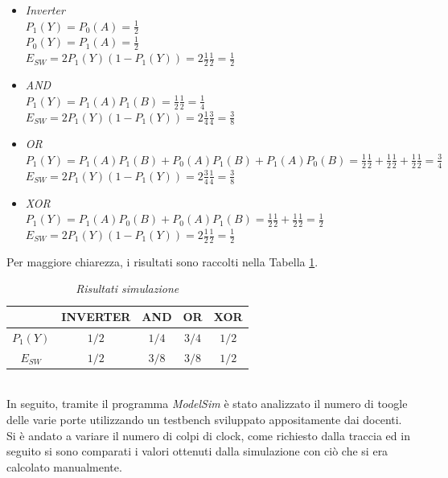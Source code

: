 \begin{itemize}
	\item \textit{Inverter} \\
	$P_{1}(Y)=P_{0}(A)=\frac{1}{2}$ \\
	$P_{0}(Y)=P_{1}(A)=\frac{1}{2}$ \\
	$E_{SW}=2P_{1}(Y)(1-P_{1}(Y))=2\frac{1}{2}\frac{1}{2}=\frac{1}{2}$\\
	\item \textit{AND} \\
	$P_{1}(Y)=P_{1}(A)P_{1}(B)=\frac{1}{2}\frac{1}{2}=\frac{1}{4}$ \\
	$E_{SW}=2P_{1}(Y)(1-P_{1}(Y))=2\frac{1}{4}\frac{3}{4}=\frac{3}{8}$\\
	\item \textit{OR} \\
	$P_{1}(Y)=P_{1}(A)P_{1}(B)+P_{0}(A)P_{1}(B)+P_{1}(A)P_{0}(B)=\frac{1}{2}\frac{1}{2}+\frac{1}{2}\frac{1}{2}+\frac{1}{2}\frac{1}{2}=\frac{3}{4}$ \\
	$E_{SW}=2P_{1}(Y)(1-P_{1}(Y))=2\frac{3}{4}\frac{1}{4}=\frac{3}{8}$\\
	\item \textit{XOR} \\
	$P_{1}(Y)=P_{1}(A)P_{0}(B)+P_{0}(A)P_{1}(B)=\frac{1}{2}\frac{1}{2}+\frac{1}{2}\frac{1}{2}=\frac{1}{2}$ \\
	$E_{SW}=2P_{1}(Y)(1-P_{1}(Y))=2\frac{1}{2}\frac{1}{2}=\frac{1}{2}$\\
\end{itemize}
Per maggiore chiarezza, i risultati sono raccolti nella Tabella \ref{Tab1_1}. \\
\begin{table}[!h]\footnotesize
	\centering
	\begin{tabular}{|c|c|c|c|c|}
		\hline
		 & \textbf{INVERTER}& \textbf{AND}& \textbf{OR} &\textbf{XOR}\\
		\hline
		$P_{1}(Y)$ & $1/2$  & $1/4$& $3/4$&$1/2$\\
		\hline
		$E_{SW}$& $1/2$ &$3/8$&$3/8$& $1/2$\\
		\hline
	\end{tabular}
	\caption{\textit{Risultati simulazione}}
	\label{Tab1_1}
\end{table}\\
In seguito, tramite il programma \textit{ModelSim} è stato analizzato il numero di toogle delle varie porte utilizzando un testbench sviluppato appositamente dai docenti. Si è andato a variare il numero di colpi di clock, come richiesto dalla traccia ed in seguito si sono comparati i valori ottenuti dalla simulazione con ciò che si era calcolato manualmente.\\
